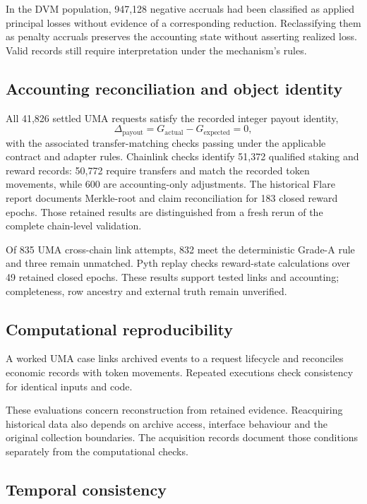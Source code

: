 In the DVM population, 947,128 negative accruals had been classified as applied principal losses without evidence of a corresponding reduction. Reclassifying them as penalty accruals preserves the accounting state without asserting realized loss. Valid records still require interpretation under the mechanism's rules.

\subsection{Accounting reconciliation and object identity}

All 41,826 settled UMA requests satisfy the recorded integer payout identity,
\begin{equation}
 \Delta_{\mathrm{payout}}=G_{\mathrm{actual}}-G_{\mathrm{expected}}=0,
 \label{eq:payoutcheck}
\end{equation}
with the associated transfer-matching checks passing under the applicable contract and adapter rules. Chainlink checks identify 51,372 qualified staking and reward records: 50,772 require transfers and match the recorded token movements, while 600 are accounting-only adjustments. The historical Flare report documents Merkle-root and claim reconciliation for 183 closed reward epochs. Those retained results are distinguished from a fresh rerun of the complete chain-level validation.

Of 835 UMA cross-chain link attempts, 832 meet the deterministic Grade-A rule and three remain unmatched. Pyth replay checks reward-state calculations over 49 retained closed epochs. These results support tested links and accounting; completeness, row ancestry and external truth remain unverified.

\subsection{Computational reproducibility}

A worked UMA case links archived events to a request lifecycle and reconciles economic records with token movements. Repeated executions check consistency for identical inputs and code.

These evaluations concern reconstruction from retained evidence. Reacquiring historical data also depends on archive access, interface behaviour and the original collection boundaries. The acquisition records document those conditions separately from the computational checks.

\subsection{Temporal consistency}

